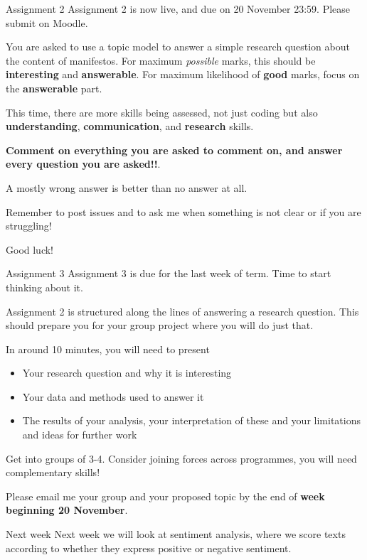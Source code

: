 \documentclass[
  10pt,
  ignorenonframetext,
  aspectratio=169]{beamer}
\newif\ifbibliography
\providecommand{\tightlist}{%
  \setlength{\itemsep}{0pt}\setlength{\parskip}{0pt}}
\begin{document}
\begin{frame}{Assignment 2}
\protect\hypertarget{assignment-2}{}
Assignment 2 is now live, and due on 20 November 23:59. Please submit on
Moodle.

You are asked to use a topic model to answer a simple research question
about the content of manifestos. For maximum \emph{possible} marks, this
should be \textbf{interesting} and \textbf{answerable}. For maximum
likelihood of \textbf{good} marks, focus on the \textbf{answerable}
part.

This time, there are more skills being assessed, not just coding but
also \textbf{understanding}, \textbf{communication}, and
\textbf{research} skills.

\textbf{Comment on everything you are asked to comment on, and answer
every question you are asked!!}.

A mostly wrong answer is better than no answer at all.

Remember to post issues and to ask me when something is not clear or if
you are struggling!

Good luck!
\end{frame}

\begin{frame}{Assignment 3}
\protect\hypertarget{assignment-3}{}
Assignment 3 is due for the last week of term. Time to start thinking
about it.

Assignment 2 is structured along the lines of answering a research
question. This should prepare you for your group project where you will
do just that.

In around 10 minutes, you will need to present

\begin{itemize}
\tightlist
\item
  Your research question and why it is interesting
\item
  Your data and methods used to answer it
\item
  The results of your analysis, your interpretation of these and your
  limitations and ideas for further work
\end{itemize}

Get into groups of 3-4. Consider joining forces across programmes, you
will need complementary skills!

Please email me your group and your proposed topic by the end of
\textbf{week beginning 20 November}.
\end{frame}

\begin{frame}{Next week}
\protect\hypertarget{next-week}{}
Next week we will look at sentiment analysis, where we score texts
according to whether they express positive or negative sentiment.
\end{frame}

\begin{frame}[allowframebreaks]{}
  \bibliographytrue
  
\end{frame}
\end{document}
